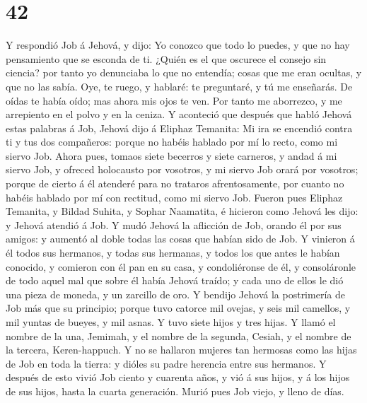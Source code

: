 \hypertarget{section-41}{%
\section{42}\label{section-41}}

 Y respondió Job á Jehová, y dijo:  Yo
conozco que todo lo puedes, y que no hay pensamiento que se esconda de
ti.  ¿Quién es el que oscurece el consejo sin ciencia? por
tanto yo denunciaba lo que no entendía; cosas que me eran ocultas, y que
no las sabía.  Oye, te ruego, y hablaré: te preguntaré, y
tú me enseñarás.  De oídas te había oído; mas ahora mis
ojos te ven.  Por tanto me aborrezco, y me arrepiento en
el polvo y en la ceniza.  Y aconteció que después que
habló Jehová estas palabras á Job, Jehová dijo á Eliphaz Temanita: Mi
ira se encendió contra ti y tus dos compañeros: porque no habéis hablado
por mí lo recto, como mi siervo Job.  Ahora pues, tomaos
siete becerros y siete carneros, y andad á mi siervo Job, y ofreced
holocausto por vosotros, y mi siervo Job orará por vosotros; porque de
cierto á él atenderé para no trataros afrentosamente, por cuanto no
habéis hablado por mí con rectitud, como mi siervo Job. 
Fueron pues Eliphaz Temanita, y Bildad Suhita, y Sophar Naamatita, é
hicieron como Jehová les dijo: y Jehová atendió á Job.  Y
mudó Jehová la aflicción de Job, orando él por sus amigos: y aumentó al
doble todas las cosas que habían sido de Job.  Y vinieron
á él todos sus hermanos, y todas sus hermanas, y todos los que antes le
habían conocido, y comieron con él pan en su casa, y condoliéronse de
él, y consoláronle de todo aquel mal que sobre él había Jehová traído; y
cada uno de ellos le dió una pieza de moneda, y un zarcillo de oro.
 Y bendijo Jehová la postrimería de Job más que su
principio; porque tuvo catorce mil ovejas, y seis mil camellos, y mil
yuntas de bueyes, y mil asnas.  Y tuvo siete hijos y tres
hijas.  Y llamó el nombre de la una, Jemimah, y el nombre
de la segunda, Cesiah, y el nombre de la tercera, Keren-happuch.
 Y no se hallaron mujeres tan hermosas como las hijas de
Job en toda la tierra: y dióles su padre herencia entre sus hermanos.
 Y después de esto vivió Job ciento y cuarenta años, y
vió á sus hijos, y á los hijos de sus hijos, hasta la cuarta generación.
 Murió pues Job viejo, y lleno de días.
